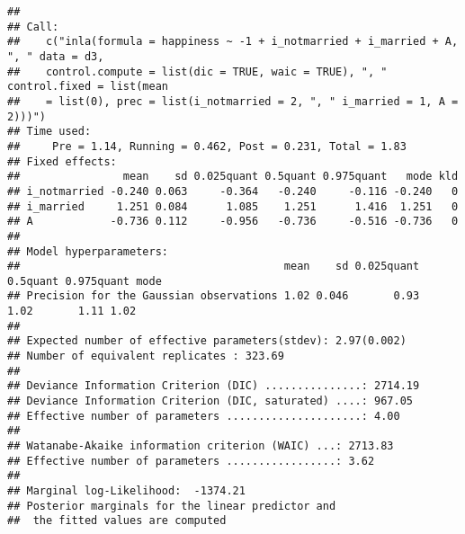 \documentclass[
]{article}
\newenvironment{Shaded}{\begin{snugshade}}{\end{snugshade}}
\newcommand{\DataTypeTok}[1]{\textcolor[rgb]{0.13,0.29,0.53}{#1}}
\newcommand{\DecValTok}[1]{\textcolor[rgb]{0.00,0.00,0.81}{#1}}
\newcommand{\FloatTok}[1]{\textcolor[rgb]{0.00,0.00,0.81}{#1}}
\newcommand{\KeywordTok}[1]{\textcolor[rgb]{0.13,0.29,0.53}{\textbf{#1}}}
\newcommand{\NormalTok}[1]{#1}
\newcommand{\OperatorTok}[1]{\textcolor[rgb]{0.81,0.36,0.00}{\textbf{#1}}}
\newcommand{\OtherTok}[1]{\textcolor[rgb]{0.56,0.35,0.01}{#1}}
\newcommand{\StringTok}[1]{\textcolor[rgb]{0.31,0.60,0.02}{#1}}
\begin{document}
\begin{Shaded}
\end{Shaded}

\begin{verbatim}
## 
## Call:
##    c("inla(formula = happiness ~ -1 + i_notmarried + i_married + A, ", " data = d3, 
##    control.compute = list(dic = TRUE, waic = TRUE), ", " control.fixed = list(mean 
##    = list(0), prec = list(i_notmarried = 2, ", " i_married = 1, A = 2)))") 
## Time used:
##     Pre = 1.14, Running = 0.462, Post = 0.231, Total = 1.83 
## Fixed effects:
##                mean    sd 0.025quant 0.5quant 0.975quant   mode kld
## i_notmarried -0.240 0.063     -0.364   -0.240     -0.116 -0.240   0
## i_married     1.251 0.084      1.085    1.251      1.416  1.251   0
## A            -0.736 0.112     -0.956   -0.736     -0.516 -0.736   0
## 
## Model hyperparameters:
##                                         mean    sd 0.025quant 0.5quant 0.975quant mode
## Precision for the Gaussian observations 1.02 0.046       0.93     1.02       1.11 1.02
## 
## Expected number of effective parameters(stdev): 2.97(0.002)
## Number of equivalent replicates : 323.69 
## 
## Deviance Information Criterion (DIC) ...............: 2714.19
## Deviance Information Criterion (DIC, saturated) ....: 967.05
## Effective number of parameters .....................: 4.00
## 
## Watanabe-Akaike information criterion (WAIC) ...: 2713.83
## Effective number of parameters .................: 3.62
## 
## Marginal log-Likelihood:  -1374.21 
## Posterior marginals for the linear predictor and
##  the fitted values are computed
\end{verbatim}
\end{document}

